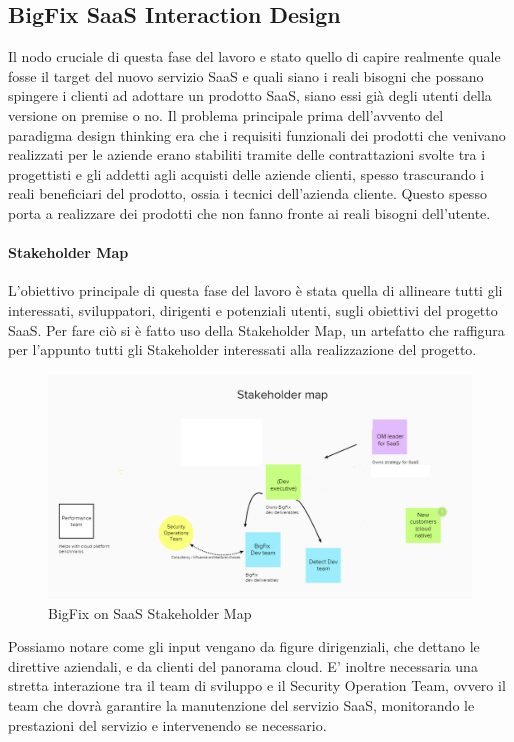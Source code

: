 \subsection{BigFix SaaS Interaction Design}
Il nodo cruciale di questa fase del lavoro e stato quello di capire realmente quale fosse il target del nuovo servizio SaaS e quali siano i reali bisogni che possano spingere i clienti ad adottare un prodotto SaaS, siano essi già degli utenti della versione on premise o no. Il problema principale prima dell'avvento del paradigma design thinking era che i requisiti funzionali dei prodotti che venivano realizzati per le aziende erano stabiliti tramite delle contrattazioni svolte tra i progettisti e gli addetti agli acquisti delle aziende clienti, spesso trascurando i reali beneficiari del prodotto, ossia i tecnici dell'azienda cliente. Questo spesso porta a realizzare dei prodotti che non fanno fronte ai reali bisogni dell'utente. 

\paragraph{Stakeholder Map}
L'obiettivo principale di questa fase del lavoro è stata quella di allineare tutti gli interessati, sviluppatori, dirigenti e potenziali utenti, sugli obiettivi del progetto SaaS. Per fare ciò si è fatto uso della Stakeholder Map, un artefatto che raffigura per l'appunto tutti gli Stakeholder interessati alla realizzazione del progetto. 
\begin{figure}[h!]
	\centering
	\includegraphics[width=\textwidth,keepaspectratio=true]{capitoli/imgs/StakeholderMap.PNG}
	\caption{BigFix on SaaS Stakeholder Map}
\end{figure}
Possiamo notare come gli input vengano da figure dirigenziali, che dettano le direttive aziendali, e da clienti del panorama cloud. E' inoltre necessaria una stretta interazione tra il team di sviluppo e il Security Operation Team, ovvero il team che dovrà garantire la manutenzione del servizio SaaS, monitorando le prestazioni del servizio e intervenendo se necessario.

